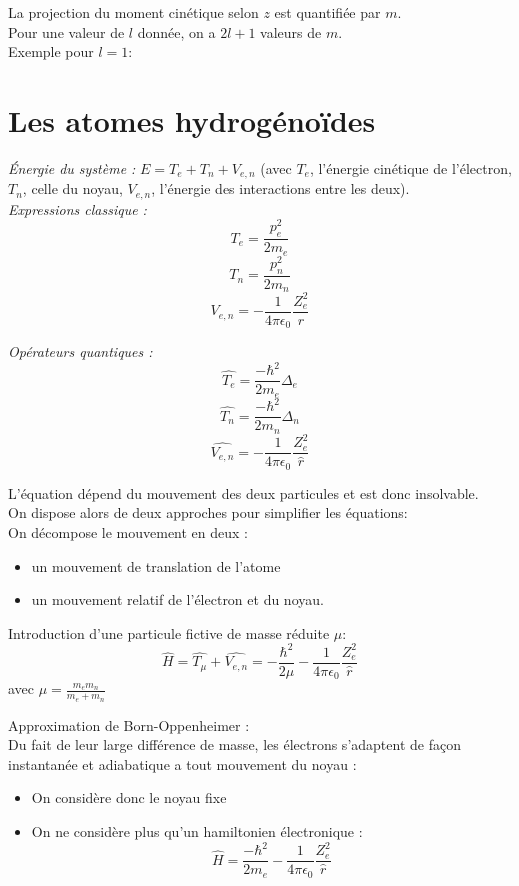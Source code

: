 \documentclass[../main.tex]{subfile}
\begin{document}
   La projection du moment cinétique selon $z$ est quantifiée par $m$.\\
   Pour une valeur de $l$ donnée, on a $2l+1$ valeurs de $m$.\\

   Exemple pour $l=1$:


\section{Les atomes hydrogénoïdes}


\emph{Énergie du système :} $E = T_e + T_n + V_{e,n}$ (avec $T_e$, l'énergie cinétique de l'électron, $T_n$, celle du noyau, $V_{e,n}$, l'énergie des interactions entre les deux).\\

\emph{Expressions classique :}\\
$$T_e = \frac{p_e^2}{2m_e}$$
$$T_n = \frac{p_n^2}{2m_n}$$
$$V_{e,n} = -\frac{1}{4\pi\epsilon_0} \frac{Z_e^2}{r}$$

\emph{Opérateurs quantiques :}\\
$$\hat{T_e} = \frac{-\hbar^2}{2m_e} \Delta_e$$
$$\hat{T_n} = \frac{-\hbar^2}{2m_n} \Delta_n$$
$$\hat{V_{e,n}} = -\frac{1}{4\pi\epsilon_0} \frac{Z_e^2}{\hat{r}}$$


   L'équation dépend du mouvement des deux particules et est donc insolvable.\\
   On dispose alors de deux approches pour simplifier les équations:\\

   On décompose le mouvement en deux :
  \begin{itemize} 
         \item un mouvement de translation de l'atome
         \item un mouvement relatif de l'électron et du noyau.
  \end{itemize}

  Introduction d'une particule fictive de masse réduite $\mu$:
  $$\hat{H} = \hat{T_\mu} + \hat{V_{e,n}} = -\frac{\hbar^2}{2\mu} - \frac{1}{4\pi\epsilon_0} \frac{Z_e^2}{\hat{r}}$$
  avec $\mu = \frac{m_em_n}{m_e + m_n}$

  Approximation de Born-Oppenheimer : \\
  Du fait de leur large différence de masse, les électrons s'adaptent de façon instantanée et adiabatique a tout mouvement du noyau :\\
 \begin{itemize} 
         \item On considère donc le noyau fixe
         \item On ne considère plus qu'un hamiltonien électronique :
            $$\hat{H}= \frac{-\hbar^2}{2m_e} - \frac{1}{4\pi\epsilon_0}\frac{Z_e^2}{\hat{r}}$$
 \end{itemize}
\end{document}
